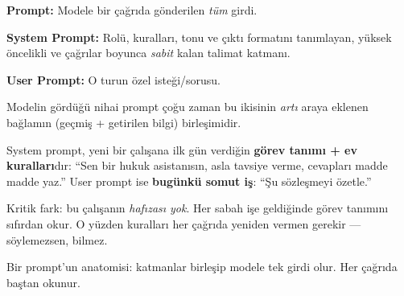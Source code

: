 \begin{problembox}
\textbf{Prompt:} Modele bir çağrıda gönderilen \emph{tüm} girdi.

\smallskip
\textbf{System Prompt:} Rolü, kuralları, tonu ve çıktı formatını tanımlayan,
yüksek öncelikli ve çağrılar boyunca \emph{sabit} kalan talimat katmanı.

\smallskip
\textbf{User Prompt:} O turun özel isteği/sorusu.
\end{problembox}

Modelin gördüğü nihai prompt çoğu zaman bu ikisinin \emph{artı} araya eklenen
bağlamın (geçmiş + getirilen bilgi) birleşimidir.

\begin{mentalbox}
System prompt, yeni bir çalışana ilk gün verdiğin \textbf{görev tanımı + ev
kuralları}dır: ``Sen bir hukuk asistanısın, asla tavsiye verme, cevapları madde
madde yaz.'' User prompt ise \textbf{bugünkü somut iş}: ``Şu sözleşmeyi özetle.''

\smallskip
Kritik fark: bu çalışanın \emph{hafızası yok}. Her sabah işe geldiğinde görev
tanımını sıfırdan okur. O yüzden kuralları her çağrıda yeniden vermen gerekir ---
söylemezsen, bilmez.
\end{mentalbox}

Bir prompt'un anatomisi: katmanlar birleşip modele tek girdi olur. Her çağrıda
baştan okunur.

